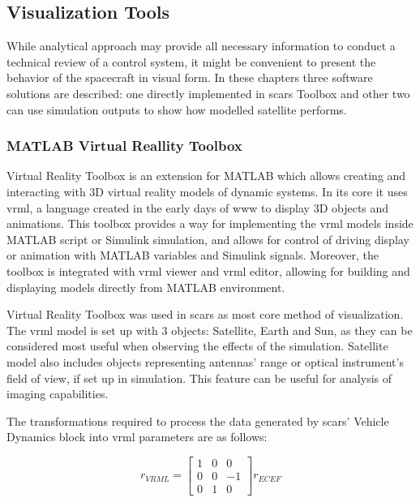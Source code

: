 \subsection{Visualization Tools}\label{sec:visualization}
    While analytical approach may provide all necessary information to conduct a technical review of a control system, it might be convenient to present the behavior of the spacecraft in visual form. In these chapters three software solutions are described: one directly implemented in \ac{scars} Toolbox and other two can use simulation outputs to show how modelled satellite performs.
    
    \subsubsection{MATLAB Virtual Reallity Toolbox}
        Virtual Reality Toolbox is an extension for MATLAB which allows creating and interacting with 3D virtual reality models of dynamic systems. In its core it uses \ac{vrml}, a language created in the early days of \ac{www} to display 3D objects and animations. This toolbox provides a way for implementing the \ac{vrml} models inside MATLAB script or Simulink simulation, and allows for control of driving display or animation with MATLAB variables and Simulink signals. Moreover, the toolbox is integrated with \ac{vrml} viewer and \ac{vrml} editor, allowing for building and displaying models directly from MATLAB environment.

        Virtual Reality Toolbox was used in \ac{scars} as most core method of visualization. The \ac{vrml} model is set up with 3 objects: Satellite, Earth and Sun, as they can be considered most useful when observing the effects of the simulation. Satellite model also includes objects representing antennas' range or optical instrument's field of view, if set up in simulation. This feature can be useful for analysis of imaging capabilities.

        The transformations required to process the data generated by \ac{scars}' Vehicle Dynamics block into \ac{vrml} parameters are as follows:
        
        \begin{equation}
            r_{VRML}=
            \begin{bmatrix}
            1&0&0\\ 
            0&0&-1\\ 
            0&1&0
            \end{bmatrix}
            r_{ECEF}
        \end{equation}
        
